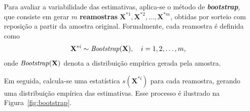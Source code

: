 
Para avaliar a variabilidade das estimativas, aplica-se o método de \textbf{\textit{bootstrap}}, que consiste em gerar $m$ \textbf{reamostras} 
$\mathbf{X}^{*1}, \mathbf{X}^{*2}, \ldots, \mathbf{X}^{*m}$, obtidas por sorteio com reposição a partir da amostra original. Formalmente, cada reamostra é definida como
\[
\mathbf{X}^{*i} \sim \text{\textit{Bootstrap}}(\mathbf{X}), \quad i = 1,2,\ldots,m,
\]
onde $\text{\textit{Bootstrap}}(\mathbf{X})$ denota a distribuição empírica gerada pela amostra.

Em seguida, calcula-se uma estatística $s(\mathbf{X}^{*i})$ para cada reamostra, 
gerando uma distribuição empírica das estimativas. Esse processo é ilustrado 
na Figura~\ref{fig:bootstrap}.

